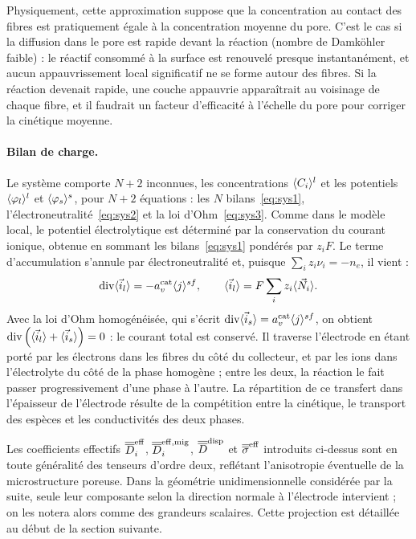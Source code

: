 Physiquement, cette approximation suppose que la concentration au contact
des fibres est pratiquement égale à la concentration moyenne du pore.
C'est le cas si la diffusion dans le pore est rapide devant la réaction
(nombre de Damköhler faible) : le réactif consommé à la surface est
renouvelé presque instantanément, et aucun appauvrissement local
significatif ne se forme autour des fibres. Si la réaction devenait
rapide, une couche appauvrie apparaîtrait au voisinage de chaque fibre,
et il faudrait un facteur d'efficacité à l'échelle du pore pour corriger
la cinétique moyenne.

\paragraph{Bilan de charge.} Le système comporte $N+2$ inconnues, les
concentrations $\langle C_i \rangle^l$ et les potentiels $\langle \varphi_l \rangle^l$ et
$\langle \varphi_s \rangle^s$, pour $N+2$ équations : les $N$
bilans~\eqref{eq:sys1}, l'électroneutralité~\eqref{eq:sys2} et la loi
d'Ohm~\eqref{eq:sys3}. Comme dans le modèle local, le potentiel électrolytique
est déterminé par la conservation du courant ionique, obtenue en sommant les
bilans~\eqref{eq:sys1} pondérés par $z_iF$. Le terme d'accumulation s'annule
par électroneutralité et, puisque $\sum_i z_i\nu_i = -n_e$, il vient :
\begin{equation}
\operatorname{div}\langle \vec{i}_l \rangle = -a_v^{\mathrm{cat}}\langle j \rangle^{sf},
\qquad
\langle \vec{i}_l \rangle = F\sum_i z_i\langle \vec{N}_i \rangle .
\label{eq:courant_homo}
\end{equation}
Avec la loi d'Ohm homogénéisée, qui s'écrit
$\operatorname{div}\langle \vec{i}_s \rangle = a_v^{\mathrm{cat}}\langle j \rangle^{sf}$, on obtient
$\operatorname{div}\left(\langle \vec{i}_l \rangle + \langle \vec{i}_s \rangle\right) = 0$ : le courant total est
conservé. Il traverse l'électrode en étant porté par les électrons dans les
fibres du côté du collecteur, et par les ions dans l'électrolyte du côté de la
phase homogène ; entre les deux, la réaction le fait passer progressivement
d'une phase à l'autre. La répartition de ce transfert dans l'épaisseur de
l'électrode résulte de la compétition entre la cinétique, le transport des
espèces et les conductivités des deux phases.

Les coefficients effectifs $\overline{\overline{D}}^{\mathrm{eff}}_i$, $\overline{\overline{D}}^{\mathrm{eff,mig}}_i$,
$\overline{\overline{D}}^{\mathrm{disp}}$ et $\overline{\overline{\sigma}}^{\mathrm{eff}}$ introduits ci-dessus sont en
toute généralité des tenseurs d'ordre deux, reflétant l'anisotropie éventuelle
de la microstructure poreuse. Dans la géométrie unidimensionnelle considérée
par la suite, seule leur composante selon la direction normale à l'électrode
intervient ; on les notera alors comme des grandeurs scalaires. Cette
projection est détaillée au début de la section suivante.

